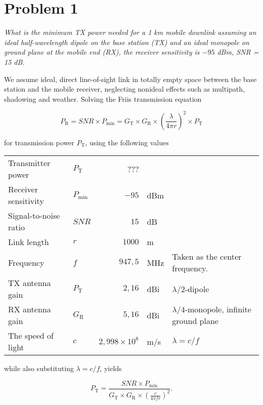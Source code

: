 \documentclass[a4paper, 12pt]{article}
\begin{document}
\section*{Problem 1}

\textit{What is the minimum TX power needed for a 1 km mobile downlink assuming an ideal 
half-wavelength dipole on the base station (TX) and an ideal monopole on ground 
plane at the mobile end (RX), the receiver sensitivity is $-95$ dBm, SNR = 15 dB.}

We assume ideal, direct line-of-sight link in totally empty space between the base 
station and the mobile receiver, neglecting nonideal effects such as multipath, 
shadowing and weather. Solving the Friis transmission equation \cite{pozar}

\begin{equation}
P_\mathrm{R} = SNR \times P_\mathrm{min} = G_\mathrm{T} \times G_\mathrm{R} \times \left(\frac{\lambda}{4 \pi r}\right)^2 \times P_\mathrm{T} 
\end{equation}

\noindent for transmission power $P_\mathrm{T}$, using the following values

\begin{table}[!h]
\begin{tabular}{llrll}
Transmitter power 		& $P_\mathrm{T}$ 		& ??? 						& 			& \\
Receiver sensitivity 	& $P_\mathrm{min}$		& $-95$ 					& dBm 		& \\
Signal-to-noise ratio 	& $SNR$ 				& $15$ 						& dB 		& \\
Link length		 		& $r$ 					& $1000$ 					& m 		& \\
Frequency				& $f$ 					& $947,\!5$ 				& MHz 		& Taken as the center frequency. \\
TX antenna gain			& $P_\mathrm{T}$ 		& $2,\!16$ 					& dBi 		& $\lambda/2$-dipole \cite{gains} \\
RX antenna gain	 		& $G_\mathrm{R}$		& $5,\!16$ 					& dBi 		& $\lambda/4$-monopole, infinite ground plane \cite{gains} \\
The speed of light		& $c$ 					& $2,\!998 \times 10^8$ 	& m/s 		& $\lambda = c / f$\\
\end{tabular}
\end{table}

\noindent while also substituting $\lambda = c / f$, yields

\begin{equation}
P_\mathrm{T} = \frac{SNR \times P_\mathrm{min}}{G_\mathrm{T} \times G_\mathrm{R} \times \displaystyle \left(\frac{c}{4 \pi f r}\right)^2}.
\end{equation}
\end{document}
